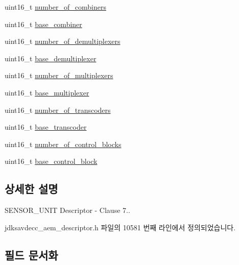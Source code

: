 \begin{DoxyCompactItemize}
\item 
uint16\+\_\+t \hyperlink{structjdksavdecc__descriptor__sensor__unit_afbc32f9432e80e58a019b1be2388cf66}{number\+\_\+of\+\_\+combiners}
\item 
uint16\+\_\+t \hyperlink{structjdksavdecc__descriptor__sensor__unit_afeae9980c36b3e99f2e4b8ab2c31e9d5}{base\+\_\+combiner}
\item 
uint16\+\_\+t \hyperlink{structjdksavdecc__descriptor__sensor__unit_ae2ee0d16f100be7e14722eaffcc600b4}{number\+\_\+of\+\_\+demultiplexers}
\item 
uint16\+\_\+t \hyperlink{structjdksavdecc__descriptor__sensor__unit_a36901b5833f03ae7be92b52745b3054c}{base\+\_\+demultiplexer}
\item 
uint16\+\_\+t \hyperlink{structjdksavdecc__descriptor__sensor__unit_aa2bffcf80dd2b162cce9a335ef515165}{number\+\_\+of\+\_\+multiplexers}
\item 
uint16\+\_\+t \hyperlink{structjdksavdecc__descriptor__sensor__unit_a3e13f295f26afe3335587c18790c7dda}{base\+\_\+multiplexer}
\item 
uint16\+\_\+t \hyperlink{structjdksavdecc__descriptor__sensor__unit_ad9030c572f8891febbc6108f96772835}{number\+\_\+of\+\_\+transcoders}
\item 
uint16\+\_\+t \hyperlink{structjdksavdecc__descriptor__sensor__unit_ac7e02a98f43dc72d6384a6635fbaf944}{base\+\_\+transcoder}
\item 
uint16\+\_\+t \hyperlink{structjdksavdecc__descriptor__sensor__unit_a564f961a8cec6e8f7b4bfdbbbfe650d4}{number\+\_\+of\+\_\+control\+\_\+blocks}
\item 
uint16\+\_\+t \hyperlink{structjdksavdecc__descriptor__sensor__unit_a9303491ec92ba42c28fb904c14d310b0}{base\+\_\+control\+\_\+block}
\end{DoxyCompactItemize}


\subsection{상세한 설명}
S\+E\+N\+S\+O\+R\+\_\+\+U\+N\+IT Descriptor -\/ Clause 7.. 

jdksavdecc\+\_\+aem\+\_\+descriptor.\+h 파일의 10581 번째 라인에서 정의되었습니다.



\subsection{필드 문서화}

